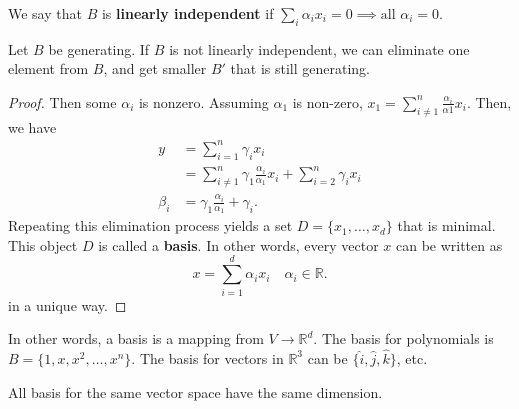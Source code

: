 \begin{definition}
	We say that \( B \) is \textbf{linearly independent} if \( \sum_{i} \alpha _i x_i = 0 \implies \text{all } \alpha _i = 0 \).
\end{definition}

\begin{prop}
	Let \( B \) be generating. If \( B \) is not linearly independent, we can eliminate one element from \( B \), and get smaller \( B' \) that is still generating.
\end{prop}
\begin{proof}
	Then some \( \alpha _i \) is nonzero. Assuming \( \alpha _1 \) is non-zero, \( x_1 = \sum_{i \neq  1}^{n} \frac{\alpha _i}{\alpha 1} x_i \). Then, we have
	\begin{align*}
		y &= \sum_{i=1}^{n} \gamma _i x_i \tag{\( B \) generating} \\
		&= \sum_{i \neq 1}^{n} \gamma _1 \frac{\alpha _i}{\alpha_1} x_i + \sum_{i=2}^{n} \gamma _i x_i\\
		\beta_i &= \gamma _1 \frac{\alpha _i}{\alpha _1} + \gamma _i
	.\end{align*}
	Repeating this elimination process yields a set \( D = \{x_{1},\ldots ,x_d\}   \) that is minimal. This object \( D \) is called a \textbf{basis}. In other words, every vector \( x \) can be written as \[
		x = \sum_{i=1}^{d} \alpha _i x_i \quad \alpha _i \in \mathbb{R}
	.\] in a unique way.
\end{proof}

In other words, a basis is a mapping from \( V \to \mathbb{R}^{d}  \). The basis for polynomials is \( B = \{1,x,x^{2},\ldots ,x^{n}  \}   \). The basis for vectors in \( \mathbb{R}^{3}  \) can be \( \{\hat{i}, \hat{j}, \hat{k}\} \), etc.

\begin{note}
	All basis for the same vector space have the same dimension.
\end{note}
